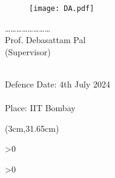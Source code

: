 
  \vspace{-1em}
  \begin{figure}[H]
  \hspace*{0.3cm}\texttt{[image: DA.pdf]}
  \end{figure}
  \vspace{-3em}
  \hspace*{0.8cm}\ldots\ldots \ldots\ldots \ldots\ldots \ldots\ldots
  \\
  \hspace*{0.8cm}\hspace*{0cm} Prof. Debasattam Pal
  \\
  \hspace*{0.8cm}\hspace*{0.9cm} (Supervisor) 
  \\\\

\vspace{1.5cm}

\noindent
 \hspace*{0.4cm}\hspace*{0.4cm} Defence Date: 4th July 2024\\\\
 \hspace*{0.4cm}\hspace*{0.4cm} Place: IIT Bombay
\begin{textblock*}{\textwidth}(3cm,31.65cm) %
    \noindent \texttt{}
\end{textblock*}

\ifnum \value{print}>0 {\myemptypage} \else {\clearpage} \fi


\ifnum \value{print}>0 {\setcounter{page}{3}} \fi

